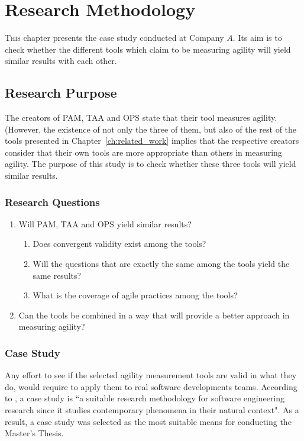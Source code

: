 \chapter{Research Methodology}
\label{ch:research_methodology}


\lettrine[lines=4, loversize=-0.1, lraise=0.1]{T}{his} chapter presents the case study conducted at Company $A$. Its aim is to check whether the different tools which claim to be measuring agility will yield similar results with each other.

\section{Research Purpose}
The creators of \ac{PAM}, \ac{TAA} and \ac{OPS} state that their tool measures agility. (However, the existence of not only the three of them, but also of the rest of the tools presented in Chapter~\ref{ch:related_work} implies that the respective creators consider that their own tools are more appropriate than others in measuring agility. The purpose of this study is to check whether these three tools will yield similar results.

\subsection{Research Questions}
\begin{enumerate}
	\item Will \ac{PAM}, \ac{TAA} and \ac{OPS} yield similar results?
	\begin{enumerate}[label={\roman*)},align=left]
  		\item Does convergent validity exist among the tools?
  		\item Will the questions that are exactly the same among the tools yield the same results?
		\item What is the coverage of agile practices among the tools?
	\end{enumerate}	
  	\item Can the tools be combined in a way that will provide a better approach in measuring agility?
\end{enumerate}

\subsection{Case Study}
Any effort to see if the selected agility measurement tools are valid in what they do, would require to apply them to real software developments teams. According to \citet{Runeson_Host}, a case study is ``a suitable research methodology for software engineering research since it studies contemporary phenomena in their natural context". As a result, a case study was selected as the most suitable means for conducting the Master's Thesis.  

